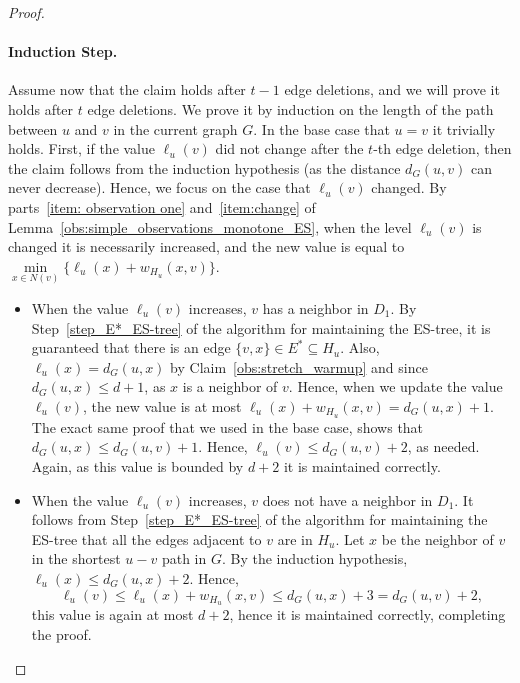 \begin{proof}
\paragraph{Induction Step.} Assume now that the claim holds after $t-1$ edge deletions, and we will prove it holds after $t$ edge deletions. We prove it by induction on the length of the path between $u$ and $v$ in the current graph $G$. In the base case that $u=v$ it trivially holds.
First, if the value $\ell_u(v)$ did not change after the $t$-th edge deletion, then the claim follows from the induction hypothesis (as the distance $d_G(u,v)$ can never decrease). Hence, we focus on the case that $\ell_u(v)$ changed. By parts~\ref{item: observation one} and~\ref{item:change} of Lemma~\ref{obs:simple_observations_monotone_ES}, when the level $\ell_u(v)$ is changed it is necessarily increased, and the new value is equal to $\min\limits_{x\in N(v)} \{\ell_u(x)+w_{H_u}(x,v) \}$. 

\begin{itemize}
    \item [Case 1:] When the value $\ell_u(v)$ increases, $v$ has a neighbor in $D_1$. By Step~\ref{step_E*_ES-tree} of the algorithm for maintaining the ES-tree, it is guaranteed that there is an edge $\{v,x\} \in E^* \subseteq H_u$. Also, $\ell_u(x)=d_G(u,x)$ by Claim~\ref{obs:stretch_warmup} and since $d_G(u,x) \leq d+1$, as $x$ is a neighbor of $v$. Hence, when we update the value $\ell_u(v)$, the new value is at most $\ell_u(x)+w_{H_u}(x,v)=d_G(u,x)+1.$ The exact same proof that we used in the base case, shows that $d_G(u,x) \leq d_G(u,v)+1$. Hence, $\ell_u(v) \leq d_G(u,v) +2$, as needed. Again, as this value is bounded by $d+2$ it is maintained correctly.
    \item [Case 2:] When the value $\ell_u(v)$ increases, $v$ does not have a neighbor in $D_1$. It follows from Step~\ref{step_E*_ES-tree} of the algorithm for maintaining the ES-tree that all the edges adjacent to $v$ are in $H_u$. Let $x$ be the neighbor of $v$ in the shortest $u-v$ path in $G$. By the induction hypothesis, $\ell_u(x) \leq d_G(u,x)+2$. Hence, $$\ell_u(v) \leq \ell_u(x)+w_{H_u}(x,v) \leq d_G(u,x)+3 = d_G(u,v)+2,$$ this value is again at most $d+2$, hence it is maintained correctly, completing the proof.\qedhere
\end{itemize}
\end{proof}


